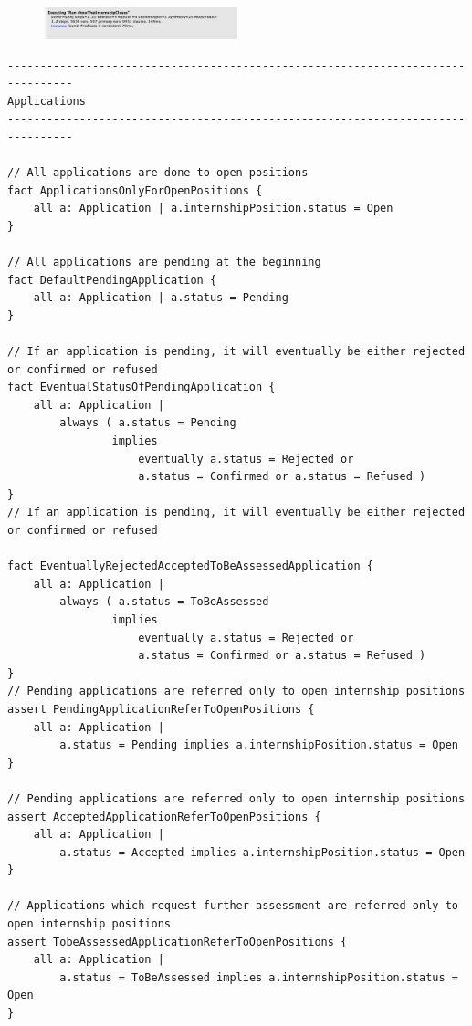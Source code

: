 \begin{figure}[h!]
    \centering\includegraphics[width=0.5\textwidth]{RASD/Images/Alloy/predshowThatInternshipCloses.png}
    \label{fig:predshowThatInternshipCloses}
\end{figure}



\begin{verbatim}
--------------------------------------------------------------------------------
Applications
--------------------------------------------------------------------------------

// All applications are done to open positions
fact ApplicationsOnlyForOpenPositions {
    all a: Application | a.internshipPosition.status = Open
}

// All applications are pending at the beginning
fact DefaultPendingApplication {
    all a: Application | a.status = Pending
}

// If an application is pending, it will eventually be either rejected or confirmed or refused
fact EventualStatusOfPendingApplication {
    all a: Application | 
        always ( a.status = Pending
                implies 
                    eventually a.status = Rejected or 
                    a.status = Confirmed or a.status = Refused )
}
// If an application is pending, it will eventually be either rejected or confirmed or refused

fact EventuallyRejectedAcceptedToBeAssessedApplication {
    all a: Application | 
        always ( a.status = ToBeAssessed
                implies 
                    eventually a.status = Rejected or 
                    a.status = Confirmed or a.status = Refused )
}
// Pending applications are referred only to open internship positions
assert PendingApplicationReferToOpenPositions {
    all a: Application | 
        a.status = Pending implies a.internshipPosition.status = Open
}

// Pending applications are referred only to open internship positions
assert AcceptedApplicationReferToOpenPositions {
    all a: Application | 
        a.status = Accepted implies a.internshipPosition.status = Open
}

// Applications which request further assessment are referred only to open internship positions
assert TobeAssessedApplicationReferToOpenPositions {
    all a: Application | 
        a.status = ToBeAssessed implies a.internshipPosition.status = Open
}
\end{verbatim}

